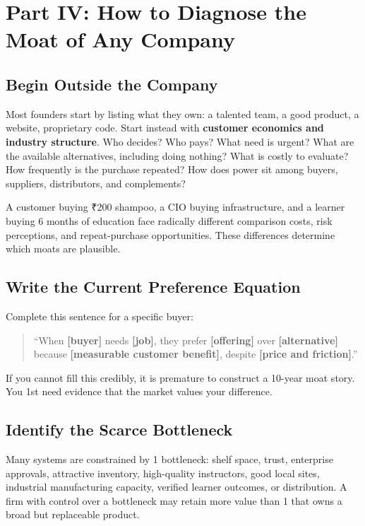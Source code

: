 \section*{Part IV: How to Diagnose the Moat of Any Company}
\label{sec:part4_how_to_diagnose_the_moat}

\subsection{Begin Outside the Company}
\label{sec:begin_outside_the_company}

Most founders start by listing what they own: a talented team, a good product, a website, proprietary code. Start instead with \textbf{customer economics and industry structure}. Who decides? Who pays? What need is urgent? What are the available alternatives, including doing nothing? What is costly to evaluate? How frequently is the purchase repeated? How does power sit among buyers, suppliers, distributors, and complements?

A customer buying ₹200 shampoo, a CIO buying infrastructure, and a learner buying 6 months of education face radically different comparison costs, risk perceptions, and repeat-purchase opportunities. These differences determine which moats are plausible.

\subsection{Write the Current Preference Equation}
\label{sec:write_current_preference_equation}

Complete this sentence for a specific buyer:
\begin{quote}
``When \textbf{[buyer]} needs \textbf{[job]}, they prefer \textbf{[offering]} over \textbf{[alternative]} because \textbf{[measurable customer benefit]}, despite \textbf{[price and friction]}.''
\end{quote}

If you cannot fill this credibly, it is premature to construct a 10-year moat story. You 1st need evidence that the market values your difference.

\subsection{Identify the Scarce Bottleneck}
\label{sec:identify_scarce_bottleneck}

Many systems are constrained by 1 bottleneck: shelf space, trust, enterprise approvals, attractive inventory, high-quality instructors, good local sites, industrial manufacturing capacity, verified learner outcomes, or distribution. A firm with control over a bottleneck may retain more value than 1 that owns a broad but replaceable product.

